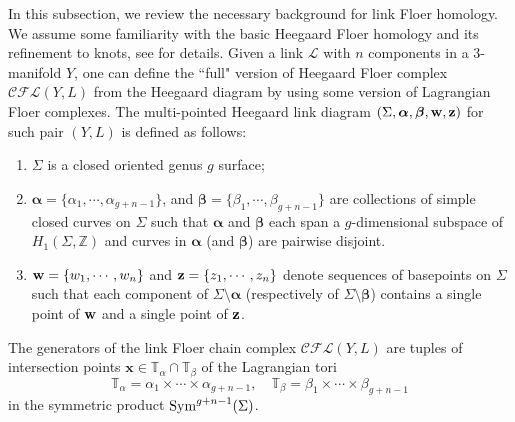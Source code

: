 \documentclass[10pt,a4paper]{amsart}
\newcommand{\cCFL}{\mathcal{C\!F\!L}}
\newcommand{\alphas}{\boldsymbol{\alpha}}
\newcommand{\betas}{\boldsymbol{\beta}}
\newcommand{\w}{\mathbf{w}}
\newcommand{\x}{\mathbf{x}}
\def\L{\mathcal{L}}
\def\w{{\bf{w}}}
\def\z{{\bf{z}}}
\def\x{\mathbf{x}}
\newcommand{\Z}{\mathbb{Z}}
\begin{document}
In this subsection, we review the necessary background for link Floer homology. We assume some familiarity with the basic Heegaard Floer homology and its refinement to knots, see \cite{OSProperties, OSKnots, OSLinks, RasmussenKnots} for details.  Given a link $\L$ with $n$ components in a 3-manifold $Y$, one can define the ``full" version of Heegaard Floer complex $\cCFL(Y, L)$ from the Heegaard diagram by using some version of Lagrangian Floer complexes. The multi-pointed Heegaard link diagram $(\Sigma, \alphas, \betas,\w, \z)$ for such pair $(Y, L)$ is defined as follows:
\begin{enumerate}
    \item  $\Sigma$ is a closed oriented genus $g$ surface;
    \item $\alphas=\{ \alpha_1, \cdots, \alpha_{g+n-1} \}$, and $\betas=\{ \beta_1, \cdots, \beta_{g+n-1}\}$ are collections of simple closed curves on $\Sigma$ such that $\alphas$ and $\betas$ each span a $g$-dimensional subspace of $H_1(\Sigma, \Z)$ and  curves in $\alphas$ (and $\betas$) are pairwise disjoint.
    \item $\w=\{w_1, \cdots, w_n\}$ and $\z=\{z_1, \cdots, z_n\}$ denote sequences of basepoints on $\Sigma$ such that each component of $\Sigma\setminus \alphas$ (respectively of $\Sigma\setminus \betas$) contains a single point of $\w$ and a single point of $\z$. 
\end{enumerate}

The generators of the link Floer chain complex $\cCFL(Y, L)$ are tuples of intersection points $\x\in \mathbb{T}_\alpha\cap \mathbb{T}_{\beta}$ of the Lagrangian tori
$$\mathbb{T}_\alpha=\alpha_1\times \cdots \times \alpha_{g+n-1}, \quad \mathbb{T}_{\beta}=\beta_1\times \cdots \times \beta_{g+n-1}$$
in the symmetric product $\textup{Sym}^{g+n-1}(\Sigma)$. 
 
\end{document}
